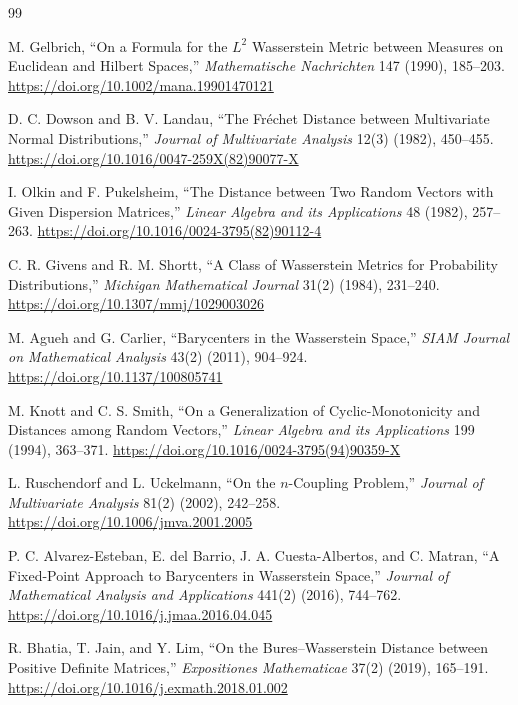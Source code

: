 \documentclass[11pt]{article}
\theoremstyle{definition}
\begin{document}
\clearpage
\small
\setlength{\parskip}{0.15em}
\begin{thebibliography}{99}

M. Gelbrich,
``On a Formula for the $L^2$ Wasserstein Metric between Measures on Euclidean
and Hilbert Spaces,''
\emph{Mathematische Nachrichten} 147 (1990), 185--203.
\url{https://doi.org/10.1002/mana.19901470121}

D. C. Dowson and B. V. Landau,
``The Fr\'echet Distance between Multivariate Normal Distributions,''
\emph{Journal of Multivariate Analysis} 12(3) (1982), 450--455.
\url{https://doi.org/10.1016/0047-259X(82)90077-X}

I. Olkin and F. Pukelsheim,
``The Distance between Two Random Vectors with Given Dispersion Matrices,''
\emph{Linear Algebra and its Applications} 48 (1982), 257--263.
\url{https://doi.org/10.1016/0024-3795(82)90112-4}

C. R. Givens and R. M. Shortt,
``A Class of Wasserstein Metrics for Probability Distributions,''
\emph{Michigan Mathematical Journal} 31(2) (1984), 231--240.
\url{https://doi.org/10.1307/mmj/1029003026}

M. Agueh and G. Carlier,
``Barycenters in the Wasserstein Space,''
\emph{SIAM Journal on Mathematical Analysis} 43(2) (2011), 904--924.
\url{https://doi.org/10.1137/100805741}

M. Knott and C. S. Smith,
``On a Generalization of Cyclic-Monotonicity and Distances among Random
Vectors,''
\emph{Linear Algebra and its Applications} 199 (1994), 363--371.
\url{https://doi.org/10.1016/0024-3795(94)90359-X}

L. Ruschendorf and L. Uckelmann,
``On the $n$-Coupling Problem,''
\emph{Journal of Multivariate Analysis} 81(2) (2002), 242--258.
\url{https://doi.org/10.1006/jmva.2001.2005}

P. C. Alvarez-Esteban, E. del Barrio, J. A. Cuesta-Albertos, and C. Matran,
``A Fixed-Point Approach to Barycenters in Wasserstein Space,''
\emph{Journal of Mathematical Analysis and Applications} 441(2) (2016),
744--762.
\url{https://doi.org/10.1016/j.jmaa.2016.04.045}

R. Bhatia, T. Jain, and Y. Lim,
``On the Bures--Wasserstein Distance between Positive Definite Matrices,''
\emph{Expositiones Mathematicae} 37(2) (2019), 165--191.
\url{https://doi.org/10.1016/j.exmath.2018.01.002}


\end{thebibliography}
\end{document}
